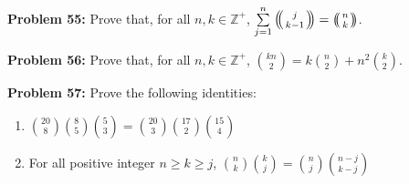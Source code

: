 \documentclass[12pt]{article}
\newcommand{\Z}{\mathbb{Z}}
\newcommand{\prob}[1]{\textbf{Problem #1:}}
\def\multiset#1#2{\ensuremath{\left(\kern-.3em\left(\genfrac{}{}{0pt}{}{#1}{#2}\right)\kern-.3em\right)}}
\begin{document}
\prob{55} Prove that, for all $n,k \in \Z^+$, $\sum\limits^n_{j=1} \multiset{j}{k-1} = \multiset{n}{k}$. 

\prob{56} Prove that, for all $n,k \in \Z^+$, $\binom{kn}{2} = k\binom{n}{2} + n^2 \binom{k}{2}$.

\prob{57} Prove the following identities:
\begin{enumerate}[label=(\alph*)]
    \item $\binom{20}{8} \binom{8}{5} \binom{5}{3} = \binom{20}{3} \binom{17}{2} \binom{15}{4}$
    \item For all positive integer $n \geq k \geq j$, $\binom{n}{k} \binom{k}{j} = \binom{n}{j} \binom{n-j}{k-j}$
\end{enumerate}
\end{document}

